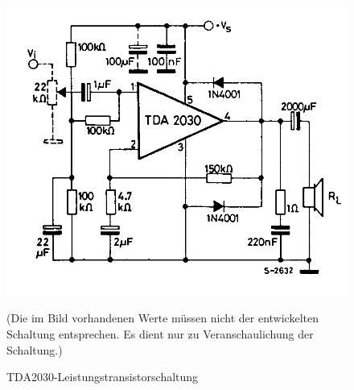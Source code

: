\begin{figure} [H]
	\centering
	\includegraphics[width=1\textwidth]{img/Grundlagen/TDA2030/TDA2030-Grundschaltung.png}
	\caption[TDA2030-Leistungstransistorschaltung]{TDA2030-Leistungstransistorschaltung\footnotemark}
	\text (Die im Bild vorhandenen Werte müssen nicht der entwickelten Schaltung entsprechen. Es dient nur zu Veranschaulichung der Schaltung.)
	\label {fig:3.2.2.1}
\end{figure}

